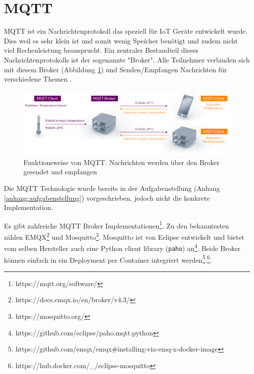
\section{MQTT} %
\label{state:mqtt}

\ac{MQTT} ist ein Nachrichtenprotokoll das speziell für \ac{IoT} Geräte entwickelt wurde.
Dies weil es sehr klein ist und somit wenig Speicher benötigt und zudem
nicht viel Rechenleistung beansprucht.
Ein zentraler Bestandteil dieses Nachrichtenprotokolls ist der sogenannte "Broker".
Alle Teilnehmer verbinden sich mit diesem Broker (Abbildung \ref{fig:mqtt}) und Senden/Empfangen Nachrichten
für verschiedene Themen \parencite{mqtt}.

\begin{figure}[H]
    \centering
    \includegraphics[width=1.0\textwidth]{gfx/mqtt-publish-subscribe}
    \caption{
        Funktionsweise von \ac{MQTT}. Nachrichten werden über den Broker gesendet und empfangen \parencite{mqtt}
    }
    \label{fig:mqtt}
\end{figure}

Die \ac{MQTT} Technologie wurde bereits in der Aufgabenstellung (Anhang \ref{anhang:aufgabenstellung}) vorgeschrieben, jedoch
nicht die konkrete Implementation.

Es gibt zahlreiche \ac{MQTT} Broker Implementationen\footnote{https://mqtt.org/software/}.
Zu den bekanntesten zählen EMQX\footnote{https://docs.emqx.io/en/broker/v4.3/} und Mosquitto\footnote{https://mosquitto.org/}.
Mosquitto ist von Eclipse entwickelt und bietet vom selben Hersteller auch eine
Python client library (\texttt{paho}) an\footnote{https://github.com/eclipse/paho.mqtt.python}.
Beide Broker können einfach in ein Deployment per Container integriert werden\footnote{https://github.com/emqx/emqx\#installing-via-emq-x-docker-image}$^{,}$\footnote{https://hub.docker.com/\_/eclipse-mosquitto}.

